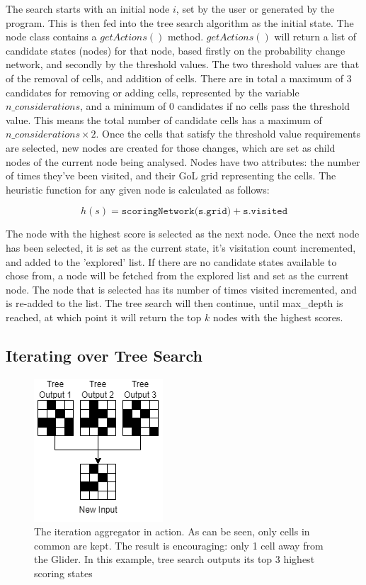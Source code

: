 \documentclass{l4proj}
\begin{document}
The search starts with an initial node $i$, set by the user or generated by the program. This is then fed into the tree search algorithm as the initial state. The node class contains a $getActions()$ method. $getActions()$ will return a list of candidate states (nodes) for that node, based firstly on the probability change network, and secondly by the threshold values. The two threshold values are that of the removal of cells, and addition of cells. There are in total a maximum of 3 candidates for removing or adding cells, represented by the variable $n\_considerations$, and a minimum of 0 candidates if no cells pass the threshold value. This means the total number of candidate cells has a maximum of $n\_considerations \times 2$. Once the cells that satisfy the threshold value requirements are selected, new nodes are created for those changes, which are set as child nodes of the current node being analysed. Nodes have two attributes: the number of times they've been visited, and their GoL grid representing the cells. The heuristic function for any given node is calculated as follows:

\[ h(s) = \texttt{scoringNetwork(s.grid)} + \texttt{s.visited} \]
 
The node with the highest score is selected as the next node. Once the next node has been selected, it is set as the current state, it's visitation count incremented, and added to the 'explored' list. If there are no candidate states available to chose from, a node will be fetched from the explored list and set as the current node. The node that is selected has its number of times visited incremented, and is re-added to the list. The tree search will then continue, until max\_depth is reached, at which point it will return the top $k$ nodes with the highest scores.

\subsection{Iterating over Tree Search}

\begin{figure}[h!]
\centering
\includegraphics[width=0.4\linewidth]{dissertation/images/diagrams/iteration_aggregator.png}
\caption{The iteration aggregator in action. As can be seen, only cells in common are kept. The result is encouraging: only 1 cell away from the Glider. In this example, tree search outputs its top 3 highest scoring states}
\label{fig:subim1}
\end{figure}
\end{document}
